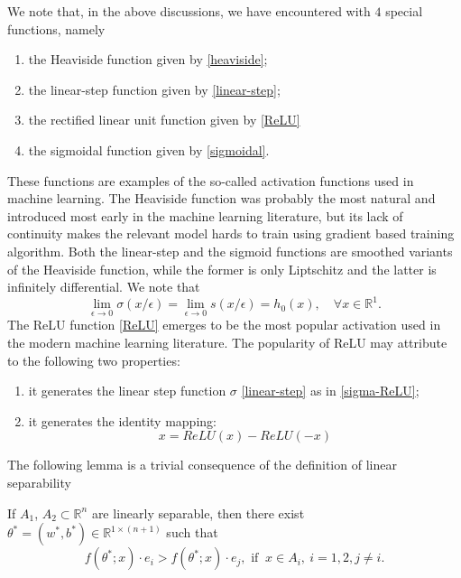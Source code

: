 \begin{remark} We note that, in the above discussions, we have
  encountered with $4$ special functions, namely
\begin{enumerate}
\item the Heaviside function given by \eqref{heaviside};
\item the linear-step function given by
  \eqref{linear-step};
\item the rectified linear unit function given by \eqref{ReLU}
\item the sigmoidal function given by \eqref{sigmoidal}.
\end{enumerate}
These functions are examples of the so-called activation functions
used in machine learning.  The Heaviside function was probably the
most natural and introduced most early in the machine learning
literature, but its lack of continuity makes the relevant model hards
to train using gradient based training algorithm.  Both the
linear-step and the sigmoid functions are smoothed variants of the
Heaviside function, while the former is only Liptschitz and the latter
is infinitely differential.  We note that
\begin{equation}
  \label{approx-Heaviside}
\lim_{\epsilon\to 0}\sigma(x/\epsilon) =
\lim_{\epsilon\to 0}s(x/\epsilon) =h_0(x), \quad\forall x\in
\mathbb R^1. 
\end{equation}
The ReLU function \eqref{ReLU} emerges to be the most popular
activation used in the modern machine learning literature.  The
popularity of ReLU may attribute to the following two properties:
\begin{enumerate}
\item it generates the linear step function $\sigma$
  \eqref{linear-step} as in \eqref{sigma-ReLU};
\item it generates the identity mapping:
  \begin{equation}
    \label{ReLU-identity}
x=ReLU(x)-ReLU(-x)    
  \end{equation}
\end{enumerate}

\end{remark}
The following lemma is a trivial consequence of the definition of linear separability
\begin{lemma}
	If $A_1$, $A_2\subset\mathbb{R}^n$ are linearly separable,
        then there exist $\theta^* = (w^*,b^*)\in\mathbb{R}^{1\times
          (n+1)}$ such that
\begin{equation}\label{ftheta}
f(\theta^*;x)\cdot e_i>f(\theta^*;x)\cdot e_j, \mbox{ if }\ x\in A_i,\ i=1,2, j\neq i.          
\end{equation}
\end{lemma}

